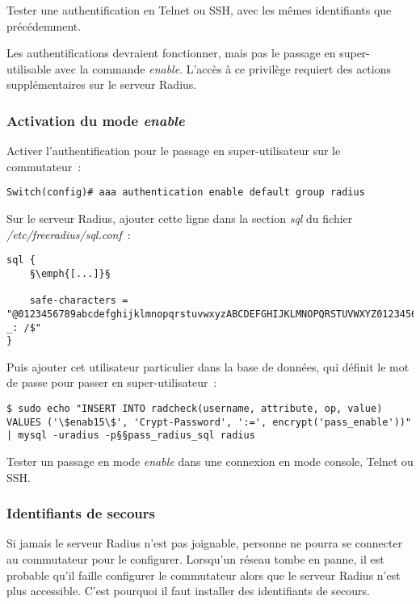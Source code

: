Tester une authentification en Telnet ou SSH, avec les mêmes identifiants que précédemment.

Les authentifications devraient fonctionner, mais pas le passage en super-utilisable avec la commande \emph{enable}. L'accès à ce privilège requiert des actions supplémentaires sur le serveur Radius.

\subsubsection{Activation du mode \emph{enable}}

Activer l'authentification pour le passage en super-utilisateur sur le commutateur~:

\begin{lstlisting}[morekeywords=0]
Switch(config)# aaa authentication enable default group radius
\end{lstlisting}

Sur le serveur Radius, ajouter cette ligne dans la section \emph{sql} du fichier \emph{/etc/freeradius/sql.conf}~:

\begin{lstlisting}
sql {
	§\emph{[...]}§

	safe-characters = "@0123456789abcdefghijklmnopqrstuvwxyzABCDEFGHIJKLMNOPQRSTUVWXYZ0123456789.-_: /$"
}
\end{lstlisting}

Puis ajouter cet utilisateur particulier dans la base de données, qui définit le mot de passe pour passer en super-utilisateur~:

\begin{lstlisting}
$ sudo echo "INSERT INTO radcheck(username, attribute, op, value) VALUES ('\$enab15\$', 'Crypt-Password', ':=', encrypt('pass_enable'))" | mysql -uradius -p§§pass_radius_sql radius
\end{lstlisting}

Tester un passage en mode \emph{enable} dans une connexion en mode console, Telnet ou SSH.

\subsubsection{Identifiants de secours}

Si jamais le serveur Radius n'est pas joignable, personne ne pourra se connecter au commutateur pour le configurer. Lorsqu'un réseau tombe en panne, il est probable qu'il faille configurer le commutateur alors que le serveur Radius n'est plus accessible. C'est pourquoi il faut installer des identifiants de secours.

